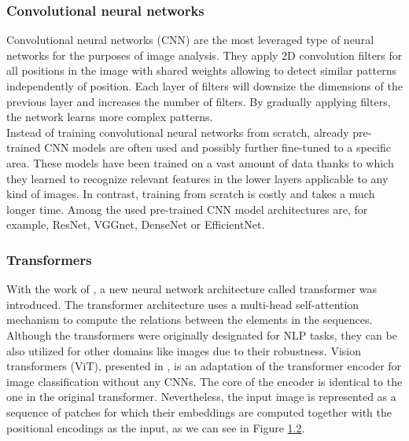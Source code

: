 \subsubsection{Convolutional neural networks}
Convolutional neural networks (CNN)\citep{o2015introduction} are the most leveraged type of neural networks for the purposes of image analysis. They apply 2D convolution filters for all positions in the image with shared weights allowing to detect similar patterns independently of position. Each layer of filters will downsize the dimensions of the previous layer and increases the number of filters. By gradually applying filters, the network learns more complex patterns.\\

Instead of training convolutional neural networks from scratch, already pre-trained CNN models are often used and possibly further fine-tuned to a specific area. These models have been trained on a vast amount of data thanks to which they learned to recognize relevant features in the lower layers applicable to any kind of images. In contrast, training from scratch is costly and takes a much longer time. Among the used pre-trained CNN model architectures are, for example, ResNet\citep{he2016deep}, VGGnet\citep{simonyan2014very}, DenseNet\citep{huang2017densely} or EfficientNet\citep{tan2019efficientnet}.

\subsubsection{Transformers}
\label{sec:transformersEncoder}
With the work of \citet{vaswani2017attention}, a new neural network architecture called transformer was introduced. The transformer architecture uses a multi-head self-attention mechanism to compute the relations between the elements in the sequences. Although the transformers were originally designated for NLP tasks, they can be also utilized for other domains like images due to their robustness. Vision transformers (ViT), presented in \citet{dosovitskiy2020image}, is an adaptation of the transformer encoder for image classification without any CNNs. The core of the encoder is identical to the one in the original transformer. Nevertheless, the input image is represented as a sequence of patches for which their embeddings are computed together with the positional encodings as the input, as we can see in Figure \hyperref[fig02:ViT]{1.2}.

